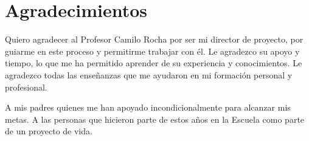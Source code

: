 
\chapter*{Agradecimientos}

Quiero agradecer al Profesor Camilo Rocha por ser mi director de proyecto, por guiarme en este proceso y permitirme trabajar con \'el. Le agradezco su apoyo y tiempo, lo que me ha permitido aprender de su experiencia y conocimientos. Le agradezco todas las ense\~nanzas que me ayudaron en mi formaci\'on personal y profesional.

A mis padres quienes me han apoyado incondicionalmente para alcanzar mis metas. A las personas que hicieron parte de estos a\~nos en la Escuela como parte de un proyecto de vida. 